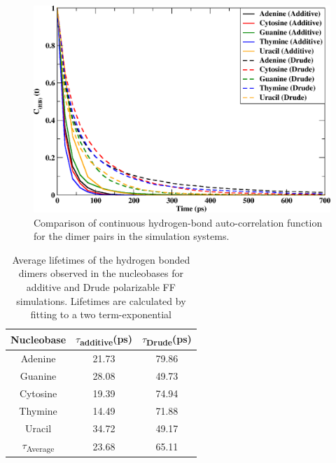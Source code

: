     \begin{figure}
        \centering
        \includegraphics[width=\textwidth]{Chapter1/Figures/autocorrelation.png}
        \caption[Comparison of continuous hydrogen-bond auto-correlation function for the dimer pairs in the simulation systems]{Comparison of continuous hydrogen-bond auto-correlation function for the dimer pairs in the simulation systems.}
    \end{figure}
    \begin{table}
        \centering
        \caption[Average lifetimes of the hydrogen bonded dimers observed in the nucleobases for additive and Drude polarizable FF simulations.]{Average lifetimes of the hydrogen bonded dimers observed in the nucleobases for additive and Drude polarizable FF simulations. Lifetimes are calculated by fitting to a two term-exponential}
        \begin{tabular}{ccc}
            \toprule
            Nucleobase  &   $\tau$\textsubscript{additive}(ps)  &   $\tau$\textsubscript{Drude}(ps) \\ \midrule
            Adenine     &   21.73   &   79.86   \\
            Guanine     &   28.08   &   49.73   \\
            Cytosine    &   19.39   &   74.94   \\
            Thymine     &   14.49   &   71.88   \\
            Uracil      &   34.72   &   49.17   \\
            $\tau$\textsubscript{Average}   &   23.68   &   65.11   \\ \bottomrule
        \end{tabular}
    \end{table}
